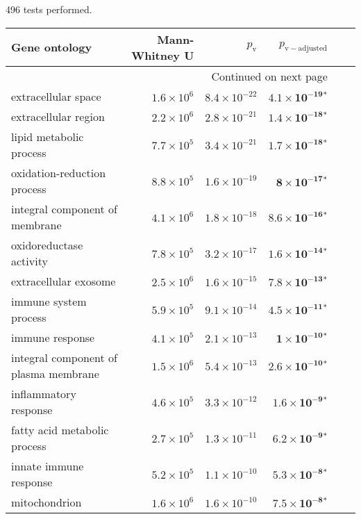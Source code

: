 \documentclass{article}
\begin{document}
496 tests performed.\scriptsize
\begin{longtable}{|l|r|r|r|r|r|}
\toprule
                            Gene ontology &     Mann-Whitney U &     $p_{\mathrm{v}}$ &      $p_{\mathrm{v-adjusted}}$ \\
\midrule
\endhead
\midrule
\multicolumn{4}{r}{{Continued on next page}} \\
\midrule
\endfoot

\bottomrule
\endlastfoot
                      extracellular space & $1.6\times 10^{6}$ & $8.4\times 10^{-22}$ &  $\bm{4.1\times 10^{-19}{^*}}$ \\
                     extracellular region & $2.2\times 10^{6}$ & $2.8\times 10^{-21}$ &  $\bm{1.4\times 10^{-18}{^*}}$ \\
                  lipid metabolic process & $7.7\times 10^{5}$ & $3.4\times 10^{-21}$ &  $\bm{1.7\times 10^{-18}{^*}}$ \\
              oxidation-reduction process & $8.8\times 10^{5}$ & $1.6\times 10^{-19}$ &   $\bm{ 8\times 10^{-17}{^*}}$ \\
           integral component of membrane & $4.1\times 10^{6}$ & $1.8\times 10^{-18}$ &  $\bm{8.6\times 10^{-16}{^*}}$ \\
                  oxidoreductase activity & $7.8\times 10^{5}$ & $3.2\times 10^{-17}$ &  $\bm{1.6\times 10^{-14}{^*}}$ \\
                    extracellular exosome & $2.5\times 10^{6}$ & $1.6\times 10^{-15}$ &  $\bm{7.8\times 10^{-13}{^*}}$ \\
                    immune system process & $5.9\times 10^{5}$ & $9.1\times 10^{-14}$ &  $\bm{4.5\times 10^{-11}{^*}}$ \\
                          immune response & $4.1\times 10^{5}$ & $2.1\times 10^{-13}$ &   $\bm{ 1\times 10^{-10}{^*}}$ \\
    integral component of plasma membrane & $1.5\times 10^{6}$ & $5.4\times 10^{-13}$ &  $\bm{2.6\times 10^{-10}{^*}}$ \\
                    inflammatory response & $4.6\times 10^{5}$ & $3.3\times 10^{-12}$ &   $\bm{1.6\times 10^{-9}{^*}}$ \\
             fatty acid metabolic process & $2.7\times 10^{5}$ & $1.3\times 10^{-11}$ &   $\bm{6.2\times 10^{-9}{^*}}$ \\
                   innate immune response & $5.2\times 10^{5}$ & $1.1\times 10^{-10}$ &   $\bm{5.3\times 10^{-8}{^*}}$ \\
                            mitochondrion & $1.6\times 10^{6}$ & $1.6\times 10^{-10}$ &   $\bm{7.5\times 10^{-8}{^*}}$ \\

\end{longtable}
\end{document}
